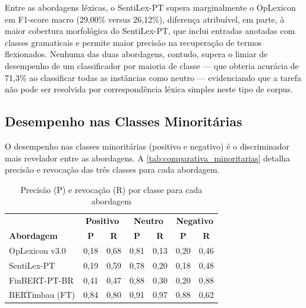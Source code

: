 Entre as abordagens léxicas, o SentiLex-PT supera marginalmente o OpLexicon em F1-score macro (29,00\% versus 26,12\%), diferença atribuível, em parte, à maior cobertura morfológica do SentiLex-PT, que inclui entradas anotadas com classes gramaticais e permite maior precisão na recuperação de termos flexionados. Nenhuma das duas abordagens, contudo, supera o limiar de desempenho de um classificador por maioria de classe --- que obteria acurácia de 71,3\% ao classificar todas as instâncias como neutro --- evidenciando que a tarefa não pode ser resolvida por correspondência léxica simples neste tipo de corpus.

\subsection{Desempenho nas Classes Minoritárias}
\label{subsec:classes_minoritarias}

O desempenho nas classes minoritárias (positivo e negativo) é o discriminador mais revelador entre as abordagens. A \autoref{tab:comparativa_minoritarias} detalha precisão e revocação das três classes para cada abordagem.

\begin{table}[!htbp]
	\caption[Precisão e revocação por classe]{Precisão (P) e revocação (R) por classe para cada abordagem}
	\label{tab:comparativa_minoritarias}
	\centering
	\begin{tabular}{lcccccc}
		\hline
		& \multicolumn{2}{c}{\textbf{Positivo}} & \multicolumn{2}{c}{\textbf{Neutro}} & \multicolumn{2}{c}{\textbf{Negativo}} \\
		\textbf{Abordagem} & \textbf{P}   & \textbf{R}              & \textbf{P}  & \textbf{R}            & \textbf{P}   & \textbf{R}              \\
		\hline
		OpLexicon v3.0     & 0,18         & 0,68                    & 0,81        & 0,13                  & 0,20         & 0,46                    \\
		\hline
		SentiLex-PT        & 0,19         & 0,59                    & 0,78        & 0,20                  & 0,18         & 0,48                    \\
		\hline
		FinBERT-PT-BR      & 0,41         & 0,47                    & 0,88        & 0,30                  & 0,20         & 0,88                    \\
		\hline
		BERTimbau (FT)     & 0,84         & 0,80                    & 0,91        & 0,97                  & 0,88         & 0,62                    \\
		\hline
	\end{tabular}
\end{table}

